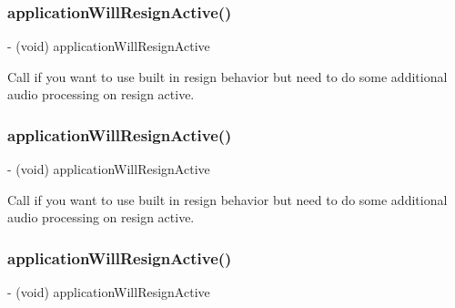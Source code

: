 \subsubsection{\texorpdfstring{application\+Will\+Resign\+Active()}{applicationWillResignActive()}\hspace{0.1cm}{\footnotesize\ttfamily [1/4]}}
{\footnotesize\ttfamily -\/ (void) application\+Will\+Resign\+Active \begin{DoxyParamCaption}{ }\end{DoxyParamCaption}}

Call if you want to use built in resign behavior but need to do some additional audio processing on resign active. \mbox{\label{interfaceCDAudioManager_a5265cc9a823688a547aa60e8995ba423}} 
\subsubsection{\texorpdfstring{application\+Will\+Resign\+Active()}{applicationWillResignActive()}\hspace{0.1cm}{\footnotesize\ttfamily [2/4]}}
{\footnotesize\ttfamily -\/ (void) application\+Will\+Resign\+Active \begin{DoxyParamCaption}{ }\end{DoxyParamCaption}}

Call if you want to use built in resign behavior but need to do some additional audio processing on resign active. \mbox{\label{interfaceCDAudioManager_a5265cc9a823688a547aa60e8995ba423}} 
\subsubsection{\texorpdfstring{application\+Will\+Resign\+Active()}{applicationWillResignActive()}\hspace{0.1cm}{\footnotesize\ttfamily [3/4]}}
{\footnotesize\ttfamily -\/ (void) application\+Will\+Resign\+Active \begin{DoxyParamCaption}{ }\end{DoxyParamCaption}}

